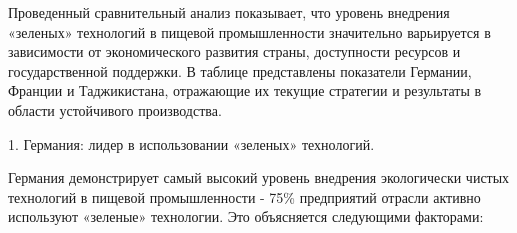 
Проведенный сравнительный анализ показывает, что уровень внедрения
«зеленых» технологий в пищевой промышленности значительно варьируется в
зависимости от экономического развития страны, доступности ресурсов и
государственной поддержки. В таблице представлены показатели Германии,
Франции и Таджикистана, отражающие их текущие стратегии и результаты в
области устойчивого производства.

1. Германия: лидер в использовании «зеленых» технологий.

Германия демонстрирует самый высокий уровень внедрения экологически
чистых технологий в пищевой промышленности - 75\% предприятий отрасли
активно используют «зеленые» технологии. Это объясняется следующими
факторами:

